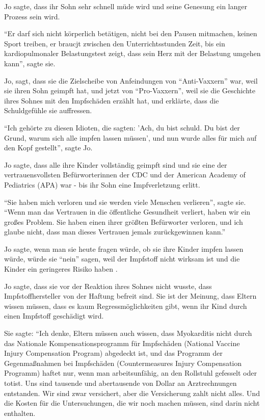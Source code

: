 {Jo sagte, dass ihr Sohn sehr schnell müde wird und seine Genesung ein langer
Prozess sein wird.

``Er darf sich nicht körperlich betätigen, nicht bei den Pausen mitmachen,
keinen Sport treiben, er braucjt zwischen den Unterrichtsstunden Zeit, bis ein
kardiopulmonaler Belastungstest zeigt, dass sein Herz mit der Belastung umgehen
kann'', sagte sie.

Jo, sagt, dass sie die Zielscheibe von Anfeindungen von ``Anti-Vaxxern'' war,
weil sie ihren Sohn geimpft hat, und jetzt von ``Pro-Vaxxern'', weil sie die
Geschichte ihres Sohnes mit den Impfschäden erzählt hat, und erklärte, dass die
Schuldgefühle sie auffressen.

``Ich gehörte zu diesen Idioten, die sagten: 'Ach, du bist schuld. Du bist der
Grund, warum sich alle impfen lassen müssen', und nun wurde alles für mich auf
den Kopf gestellt'', sagte Jo.

Jo sagte, dass alle ihre Kinder vollständig geimpft sind und sie eine der
vertrauensvollsten Befürworterinnen der CDC und der American Academy of
Pediatrics (APA) war - bis ihr Sohn eine Impfverletzung erlitt.

``Sie haben mich verloren und sie werden viele Menschen verlieren'', sagte
sie. ``Wenn man das Vertrauen in die öffentliche Gesundheit verliert, haben wir
ein großes Problem. Sie haben einen ihrer größten Befürworter verloren, und ich
glaube nicht, dass man dieses Vertrauen jemals zurückgewinnen kann.''

Jo sagte, wenn man sie heute fragen würde, ob sie ihre Kinder impfen lassen
würde, würde sie ``nein'' sagen, weil der Impfstoff nicht wirksam ist und die
Kinder ein geringeres Risiko haben .

Jo sagte, dass sie vor der Reaktion ihres Sohnes nicht wusste, dass
Impfstoffhersteller von der Haftung befreit sind. Sie ist der Meinung, dass
Eltern wissen müssen, dass es kaum Regressmöglichkeiten gibt, wenn ihr Kind
durch einen Impfstoff geschädigt wird.

Sie sagte: ``Ich denke, Eltern müssen auch wissen, dass Myokarditis nicht durch
das Nationale Kompensationsprogramm für Impfschäden (National Vaccine Injury
Compensation Program) abgedeckt ist, und das Programm der Gegenmaßnahmen bei
Impfschäden (Countermeasures Injury Compensation Programm) haftet nur, wenn man
arbeitsunfähig, an den Rollstuhl gefesselt oder totist. Uns sind tausende und
abertausende von Dollar an Arztrechnungen entstanden. Wir sind zwar versichert,
aber die Versicherung zahlt nicht alles. Und die Kosten für die Untersuchungen,
die wir noch machen müssen, sind darin nicht enthalten.

}
